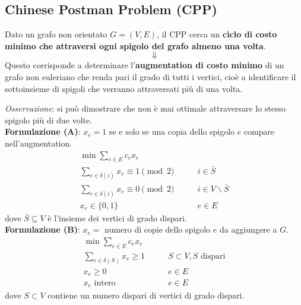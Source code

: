 \subsection{Chinese Postman Problem (CPP)}
Dato un grafo non orientato $G=(V,E)$, il CPP cerca un \textbf{ciclo di costo minimo che attraversi ogni spigolo del grafo almeno una volta}.
$$\Downarrow$$
Questo corrisponde a determinare l'\textbf{augmentation di costo minimo} di un grafo non euleriano che renda pari il grado di tutti i vertici, cioè a identificare il sottoinsieme di spigoli che verranno attraversati più di una volta.

\textit{Osservazione}: si può dimostrare che non è mai ottimale attraversare lo stesso spigolo più di due volte.\\

\textbf{Formulazione (A)}: $x_e=1$ se e solo se una copia dello spigolo $e$ compare nell'augmentation.
\begin{equation*}
	\begin{aligned}
		\min \sum_{e\in E}c_ex_e\\
		\sum_{e\in \delta (i)}x_e \equiv 1 \pmod 2 \quad & \quad i\in \bar{S}\\
		\sum_{e\in \delta (i)}x_e \equiv 0 \pmod 2 \quad & \quad i\in V\backslash \bar{S}\\
		x_e\in \{0,1\} \quad & \quad e\in E
	\end{aligned}
\end{equation*}
dove $\bar{S}\subseteq V$ è l'insieme dei vertici di grado dispari.\\

\textbf{Formulazione (B)}: $x_e=$ numero di copie dello spigolo $e$ da aggiungere a $G$.
\begin{equation*}
	\begin{aligned}
		\min \sum_{e\in E}c_ex_e\\
		\sum_{e\in \delta (S)}x_e \ge 1 \quad & \quad S\subset V, S \textrm{ dispari}\\
		x_e \ge 0 \quad & \quad e\in E\\
		x_e \textrm{ intero} \quad & \quad e\in E
	\end{aligned}
\end{equation*}
dove $S\subset V$ contiene un numero dispari di vertici di grado dispari.

